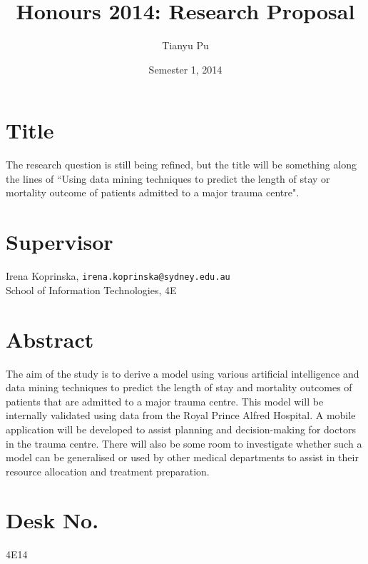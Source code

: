 \documentclass[a4paper]{article}
\title{Honours 2014: Research Proposal}
\author{Tianyu Pu}
\date{Semester 1, 2014}
\begin{document}
\maketitle

\section{Title}
The research question is still being refined, but the title will be something
along the lines of ``Using data mining techniques to predict the length of stay
or mortality outcome of patients admitted to a major trauma centre".

\section{Supervisor}
Irena Koprinska, \texttt{irena.koprinska@sydney.edu.au} \\
School of Information Technologies, 4E

\section{Abstract}
The aim of the study is to derive a model using various artificial intelligence
and data mining techniques to predict the length of stay and mortality outcomes
of patients that are admitted to a major trauma centre. This model will be
internally validated using data from the Royal Prince Alfred Hospital. A mobile
application will be developed to assist planning and decision-making for
doctors in the trauma centre. There will also be some room to investigate
whether such a model can be generalised or used by other medical departments to
assist in their resource allocation and treatment preparation.

\section{Desk No.}
4E14



\nocite{*}
\end{document}
